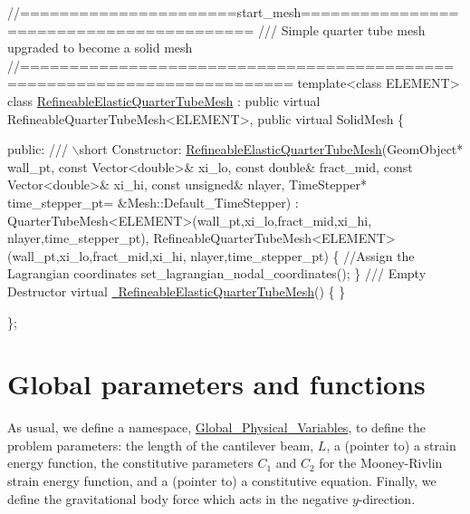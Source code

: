  
\begin{DoxyCodeInclude}
\textcolor{comment}{//======================start\_mesh=========================================}
\textcolor{comment}{/// Simple quarter tube mesh upgraded to become a solid mesh}
\textcolor{comment}{}\textcolor{comment}{//=========================================================================}
\textcolor{keyword}{template}<\textcolor{keyword}{class} ELEMENT>
\textcolor{keyword}{class }\hyperlink{classRefineableElasticQuarterTubeMesh}{RefineableElasticQuarterTubeMesh} : 
 \textcolor{keyword}{public} \textcolor{keyword}{virtual} RefineableQuarterTubeMesh<ELEMENT>, 
 \textcolor{keyword}{public} \textcolor{keyword}{virtual} SolidMesh 
\{
 
\textcolor{keyword}{public}:
 \textcolor{comment}{}
\textcolor{comment}{ /// \(\backslash\)short Constructor: }
\textcolor{comment}{} \hyperlink{classRefineableElasticQuarterTubeMesh_a97c25a8845b2d8ab2a4aef1c0407bacd}{RefineableElasticQuarterTubeMesh}(GeomObject* wall\_pt,
                                  \textcolor{keyword}{const} Vector<double>& xi\_lo,
                                  \textcolor{keyword}{const} \textcolor{keywordtype}{double}& fract\_mid,
                                  \textcolor{keyword}{const} Vector<double>& xi\_hi,
                                  \textcolor{keyword}{const} \textcolor{keywordtype}{unsigned}& nlayer,
                                  TimeStepper* time\_stepper\_pt=
                                  &Mesh::Default\_TimeStepper) :
  QuarterTubeMesh<ELEMENT>(wall\_pt,xi\_lo,fract\_mid,xi\_hi,
                           nlayer,time\_stepper\_pt),
  RefineableQuarterTubeMesh<ELEMENT>(wall\_pt,xi\_lo,fract\_mid,xi\_hi,
                                     nlayer,time\_stepper\_pt) 
  \{
   \textcolor{comment}{//Assign the Lagrangian coordinates}
   set\_lagrangian\_nodal\_coordinates();
  \}
 \textcolor{comment}{}
\textcolor{comment}{ /// Empty Destructor}
\textcolor{comment}{} \textcolor{keyword}{virtual} \hyperlink{classRefineableElasticQuarterTubeMesh_a157397dff3fb4ab8b1daea787bc9f97c}{~RefineableElasticQuarterTubeMesh}() \{ \}

\};

\end{DoxyCodeInclude}




 

\hypertarget{index_global}{}\section{Global parameters and functions}\label{index_global}
As usual, we define a namespace, {\ttfamily \hyperlink{namespaceGlobal__Physical__Variables}{Global\+\_\+\+Physical\+\_\+\+Variables}}, to define the problem parameters\+: the length of the cantilever beam, $ L $, a (pointer to) a strain energy function, the constitutive parameters $ C_1 $ and $ C_2 $ for the Mooney-\/\+Rivlin strain energy function, and a (pointer to) a constitutive equation. Finally, we define the gravitational body force which acts in the negative $ y$-\/direction.

